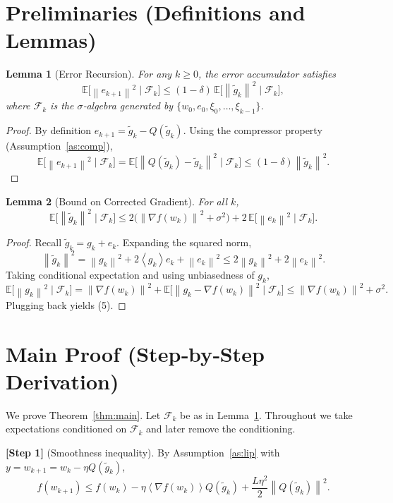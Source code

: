 \documentclass[11pt]{article}
\newtheorem{lemma}{Lemma}
\newcommand{\E}{\mathbb{E}}
\newcommand{\norm}[1]{\left\|#1\right\|}
\newcommand{\inner}[1]{\left\langle #1 \right\rangle}
\begin{document}
\section*{Preliminaries (Definitions and Lemmas)}
\begin{lemma}[Error Recursion]\label{lem:error}
For any $k\ge0$, the error accumulator satisfies
\[
\E\!\big[\norm{e_{k+1}}^{2}\mid\mathcal{F}_{k}\big]\le (1-\delta)\,\E\!\big[\norm{\tilde g_{k}}^{2}\mid\mathcal{F}_{k}\big],
\]
where $\mathcal{F}_{k}$ is the $\sigma$‑algebra generated by $\{w_{0},e_{0},\xi_{0},\dots,\xi_{k-1}\}$.
\end{lemma}
\begin{proof}
By definition $e_{k+1}= \tilde g_{k}-Q(\tilde g_{k})$. Using the compressor property (Assumption~\ref{as:comp}),
\[
\E\!\big[\norm{e_{k+1}}^{2}\mid\mathcal{F}_{k}\big]
= \E\!\big[\norm{Q(\tilde g_{k})-\tilde g_{k}}^{2}\mid\mathcal{F}_{k}\big]
\le (1-\delta)\norm{\tilde g_{k}}^{2}.
\tag{4}
\]
\end{proof}

\begin{lemma}[Bound on Corrected Gradient]\label{lem:tildeg}
For all $k$,
\[
\E\!\big[\norm{\tilde g_{k}}^{2}\mid\mathcal{F}_{k}\big]
\le 2\big(\norm{\nabla f(w_{k})}^{2}+\sigma^{2}\big)+2\,\E\!\big[\norm{e_{k}}^{2}\mid\mathcal{F}_{k}\big].
\tag{5}
\]
\end{lemma}
\begin{proof}
Recall $\tilde g_{k}=g_{k}+e_{k}$. Expanding the squared norm,
\[
\norm{\tilde g_{k}}^{2}
= \norm{g_{k}}^{2}+2\inner{g_{k}}{e_{k}}+\norm{e_{k}}^{2}
\le 2\norm{g_{k}}^{2}+2\norm{e_{k}}^{2}.
\]
Taking conditional expectation and using unbiasedness of $g_{k}$,
\[
\E\!\big[\norm{g_{k}}^{2}\mid\mathcal{F}_{k}\big]
= \norm{\nabla f(w_{k})}^{2}
+ \E\!\big[\norm{g_{k}-\nabla f(w_{k})}^{2}\mid\mathcal{F}_{k}\big]
\le \norm{\nabla f(w_{k})}^{2}+\sigma^{2}.
\]
Plugging back yields (5). \hfill\qedsymbol
\end{proof}

\newpage
\section*{Main Proof (Step‑by‑Step Derivation)}
We prove Theorem~\ref{thm:main}. Let $\mathcal{F}_{k}$ be as in Lemma~\ref{lem:error}. Throughout we take expectations conditioned on $\mathcal{F}_{k}$ and later remove the conditioning.

\bigskip
\noindent\textbf{[Step 1]} (Smoothness inequality). By Assumption~\ref{as:lip} with $y=w_{k+1}=w_{k}-\eta Q(\tilde g_{k})$,
\[
f(w_{k+1})\le f(w_{k})-\eta\inner{\nabla f(w_{k})}{Q(\tilde g_{k})}
+\frac{L\eta^{2}}{2}\norm{Q(\tilde g_{k})}^{2}. \tag{6}
\]
\end{document}
